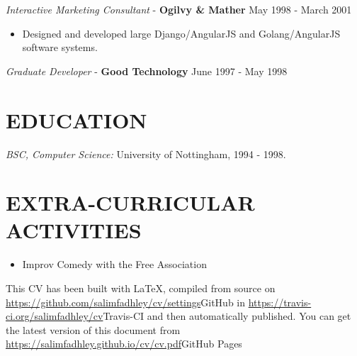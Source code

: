 \documentclass[margin, 10pt]{res} %
\begin{document}
\begin{resume}
         {\sl Interactive Marketing Consultant} - \textbf{Ogilvy \& Mather} \hfill May 1998 - March 2001\\

        \begin{itemize}
            \item Designed and developed large Django/AngularJS and Golang/AngularJS software systems.
        \end{itemize}

        {\sl Graduate Developer} - \textbf{Good Technology} \hfill June 1997 - May 1998\\


        \section{EDUCATION}

        {\sl BSC, Computer Science:} University of Nottingham, 1994 - 1998. \\


        \section{EXTRA-CURRICULAR \\ ACTIVITIES}


        \begin{itemize}
            \item Improv Comedy with the Free Association
        \end{itemize}


        {\tiny This CV has been built with \LaTeX, compiled from source on \url{https://github.com/salimfadhley/cv/settings}{GitHub} in \url{https://travis-ci.org/salimfadhley/cv}{Travis-CI} and then
        automatically published. You can get the latest version of this document from \url{https://salimfadhley.github.io/cv/cv.pdf}{GitHub Pages}}

    \end{resume}
\end{document}
